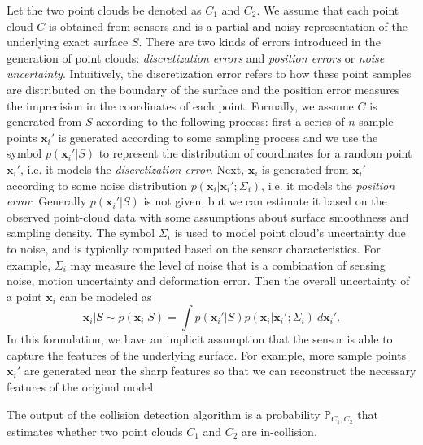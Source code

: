 Let the two point clouds be denoted as $C_1$ and $C_2$.
We assume that each point cloud $C$ is obtained from sensors and is a partial
and noisy representation of the underlying exact surface $S$. There are two kinds of errors introduced in the generation of point clouds: \emph{discretization errors}
and \emph{position errors} or \emph{noise uncertainty}. Intuitively, the discretization error refers to how these point samples are distributed on the boundary of the surface and the position error measures the imprecision in the coordinates of each point. Formally, we assume $C$ is generated from $S$ according to the following process: first a series of $n$ sample
points $\mathbf x_i'$ is generated according to some sampling process and we use the symbol $p(\mathbf x_i'|S)$ to represent the distribution of coordinates
for a random point $\mathbf x_i'$, i.e. it models the \emph{discretization error}. Next, $\mathbf x_i$ is generated from $\mathbf x_i'$
according to some noise distribution $p(\mathbf x_i|\mathbf x_i'; \Sigma_i)$, i.e. it models the \emph{position error}. Generally $p(\mathbf x_i' |S)$ is not given, but we can estimate it based on the observed point-cloud data with some assumptions about surface smoothness and sampling density. The symbol $\Sigma_i$ is used to model point cloud's uncertainty due to noise, and is typically computed based on the sensor characteristics. For example, $\Sigma_i$ may measure the level of noise that is a combination of sensing noise, motion uncertainty and deformation error. Then the overall uncertainty of a point $\mathbf x_i$ can be modeled as
\begin{equation}
\label{eq:7:point-model}
\mathbf x_i|S \sim p(\mathbf x_i|S) = \int p(\mathbf x_i'|S)p(\mathbf x_i|\mathbf x_i'; \Sigma_i) \ d\mathbf x_i'.
\end{equation}
In this formulation, we have an implicit assumption that the sensor is able to capture the features of the underlying surface. For example, more sample points $\mathbf x_i'$ are generated near the sharp features so that we can reconstruct the necessary features of the original model.

The output of the collision detection algorithm is a probability $\mathbb{P}_{C_1, C_2}$ that estimates whether two point clouds $C_1$ and $C_2$ are in-collision.

